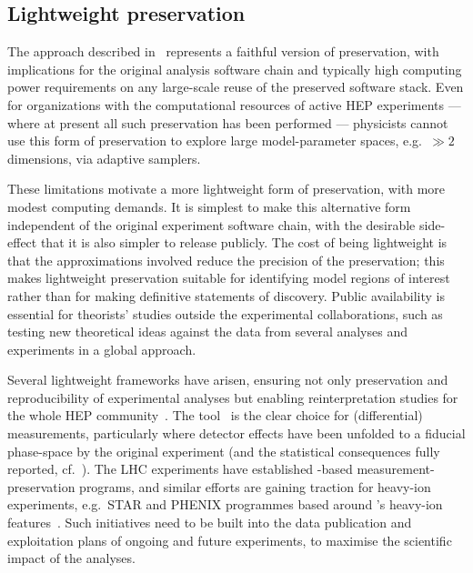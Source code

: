 \documentclass[11pt]{article}
\begin{document}
\subsection{Lightweight preservation}
\label{lightweight}

The approach described in~ represents a faithful version of preservation, with implications for the original analysis software chain and typically high computing power requirements on any large-scale reuse of the preserved software stack. Even for organizations with the computational resources of active \gls{HEP} experiments --- where at present all such preservation has been performed --- physicists cannot use this form of preservation to explore large model-parameter spaces, e.g.~$\gg 2$ dimensions, via adaptive samplers.

These limitations motivate a more lightweight form of preservation, with more modest computing demands. It is simplest to make this alternative form independent of the original experiment software chain, with the desirable side-effect that it is also simpler to release publicly. The cost of being lightweight is that the approximations involved reduce the precision of the preservation; this makes lightweight preservation suitable for identifying model regions of interest rather than for making definitive statements of discovery. Public availability is essential for theorists' studies outside the experimental collaborations, such as testing new theoretical ideas against the data from several analyses and experiments in a global approach.

Several lightweight frameworks have arisen, ensuring not only preservation and reproducibility of experimental analyses but enabling \gls{reinterpretation} studies for the whole \gls{HEP} community~\cite{LHCReinterpretationForum:2020xtr}. The \rivet tool~\cite{Bierlich:2019rhm} is the clear choice for (differential) measurements, particularly where detector effects have been unfolded to a fiducial phase-space by the original experiment (and the statistical consequences fully reported, cf.~). The \gls{LHC} experiments have established \rivet-based measurement-preservation programs, and similar efforts are gaining traction for heavy-ion experiments, e.g.~\gls{STAR} and \gls{PHENIX} programmes based around \rivet's heavy-ion features~\cite{Bierlich:2020wms}. Such initiatives need to be built into the data publication and exploitation plans of ongoing and future experiments, to maximise the scientific impact of the analyses.
\end{document}
